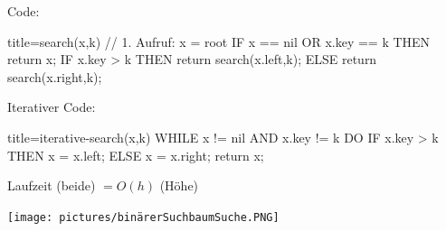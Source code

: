 \documentclass[
    ngerman,
    color=3b,
    load_common, %
    summary,
    boxarc,
]{tuda_summary}
\begin{document}
\begin{minipage}[c]{0.5\textwidth-1.85301pt}


    Code:
    \begin{codeBlock}[autogobble]{title={search(x,k) // 1. Aufruf: x = root}}
        IF x == nil OR x.key == k THEN
          return x;
        IF x.key > k THEN
          return search(x.left,k);
        ELSE
          return search(x.right,k);
    \end{codeBlock}
    Iterativer Code:
    \begin{codeBlock}[autogobble]{title={iterative-search(x,k)}}
        WHILE x != nil AND x.key != k DO
          IF x.key > k THEN
              x = x.left;
          ELSE
              x = x.right;
        return x;
    \end{codeBlock}
    Laufzeit (beide) $= O(h)$ (Höhe)
\end{minipage}
\begin{minipage}[c]{0.5\textwidth}
    \centering
    \texttt{[image: pictures/binärerSuchbaumSuche.PNG]}
\end{minipage}
\clearpage
\end{document}
